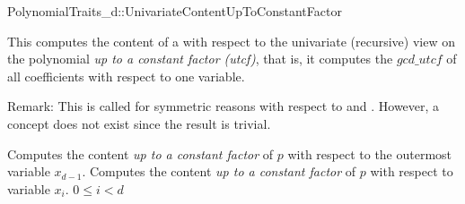 \begin{ccRefConcept}{PolynomialTraits_d::UnivariateContentUpToConstantFactor}

\ccDefinition

This  computes the content of a 
with respect to the univariate (recursive) view on the 
polynomial {\em up to  a constant factor (utcf)}, that is, 
it computes the $gcd\_utcf$ of all coefficients  with respect to one variable. 

Remark: This is called  for 
symmetric reasons with respect to  
and . 
However, a concept  
does not exist since the result is trivial. 
 
\ccRefines 
{}

\ccTypes

\ccGlue
{}

\ccOperations
{}
         {Computes the content {\em up to  a constant factor} of $p$ with 
          respect to the outermost variable $x_{d-1}$. }
         {Computes the content {\em up to  a constant factor} of $p$ with 
          respect to variable $x_i$. 
          \ccPrecond $0 \leq i  < d$
         }


\ccSeeAlso

\\
\\
\\

\end{ccRefConcept}
